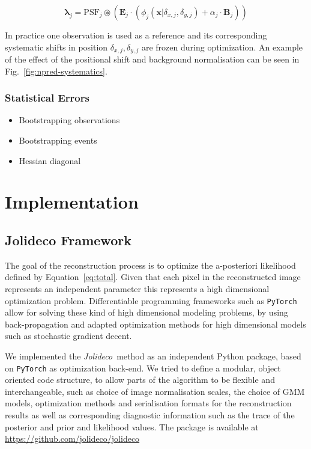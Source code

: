 \documentclass[twocolumn]{aastex631}
\newcommand{\jolideco}{\textit{Jolideco}~}
\begin{document}
    \begin{equation}
        \label{eq:model-npred-calibration}
        \mathbf{\lambda}_j = \mathrm{PSF}_j \circledast \left(\mathbf{E}_j \cdot (\phi_j(\mathbf{x}| \delta_{x,j}, \delta_{y,j}) + \alpha_j \cdot \mathbf{B}_j) \right)
    \end{equation}
    
    In practice one observation is used as a reference and its corresponding
    systematic shifts in position $\delta_{x,j}, \delta_{y,j}$ are frozen during
    optimization. An example of the effect of the positional shift and background
    normalisation can be seen in Fig.~\ref{fig:npred-systematics}.

    \subsubsection{Statistical Errors}
    \begin{itemize}
        \item Bootstrapping observations
        \item Bootstrapping events
        \item Hessian diagonal
    \end{itemize}
    
    \section{Implementation}
    \subsection{Jolideco Framework}
    The goal of the reconstruction process is to optimize the a-posteriori
    likelihood defined by Equation~\ref{eq:total}. Given that each pixel
    in the reconstructed image represents an independent parameter
    this represents a high dimensional optimization problem.
    Differentiable programming frameworks such as \texttt{PyTorch}~\citep{Pytorch2019}
    allow for solving these kind of high dimensional modeling problems, by using
    back-propagation and adapted optimization methods for high dimensional
    models such as stochastic gradient decent.

    We implemented the \jolideco method as an independent Python package, 
    based on \texttt{PyTorch} as optimization back-end. We tried to define a modular,
    object oriented code structure, to allow parts of the algorithm to be
    flexible and interchangeable, such as choice of image normalisation scales,
    the choice of GMM models, optimization methods and serialisation formats for the 
    reconstruction results as well as corresponding diagnostic information
    such as the trace of the posterior and prior and likelihood values.
    The package is available at \url{https://github.com/jolideco/jolideco}
\end{document}
